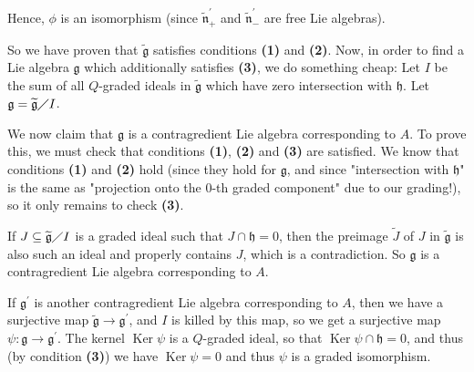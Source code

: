\documentclass
[numbers=enddot,12pt,final,onecolumn,german,notitlepage]{scrartcl}%
\theoremstyle{definition}
\begin{document}
Hence, $\phi$ is an isomorphism (since $\widetilde{\mathfrak{n}}_{+}^{\prime}$
and $\widetilde{\mathfrak{n}}_{-}^{\prime}$ are free Lie algebras).

So we have proven that $\widetilde{\mathfrak{g}}$ satisfies conditions
\textbf{(1)} and \textbf{(2)}. Now, in order to find a Lie algebra
$\mathfrak{g}$ which additionally satisfies \textbf{(3)}, we do something
cheap: Let $I$ be the sum of all $Q$-graded ideals in $\widetilde{\mathfrak{g}%
}$ which have zero intersection with $\mathfrak{h}$. Let $\mathfrak{g}%
=\widetilde{\mathfrak{g}}\diagup I$.

We now claim that $\mathfrak{g}$ is a contragredient Lie algebra corresponding
to $A$. To prove this, we must check that conditions \textbf{(1)},
\textbf{(2)} and \textbf{(3)} are satisfied. We know that conditions
\textbf{(1)} and \textbf{(2)} hold (since they hold for $\mathfrak{g}$, and
since "intersection with $\mathfrak{h}$" is the same as "projection onto the
$0$-th graded component" due to our grading!), so it only remains to check
\textbf{(3)}.

If $J\subseteq\widetilde{\mathfrak{g}}\diagup I$ is a graded ideal such that
$J\cap\mathfrak{h}=0$, then the preimage $\widetilde{J}$ of $J$ in
$\widetilde{\mathfrak{g}}$ is also such an ideal and properly contains $J$,
which is a contradiction. So $\mathfrak{g}$ is a contragredient Lie algebra
corresponding to $A$.

If $\mathfrak{g}^{\prime}$ is another contragredient Lie algebra corresponding
to $A$, then we have a surjective map $\widetilde{\mathfrak{g}}\rightarrow
\mathfrak{g}^{\prime}$, and $I$ is killed by this map, so we get a surjective
map $\psi:\mathfrak{g}\rightarrow\mathfrak{g}^{\prime}$. The kernel
$\operatorname*{Ker}\psi$ is a $Q$-graded ideal, so that $\operatorname*{Ker}%
\psi\cap\mathfrak{h}=0$, and thus (by condition \textbf{(3)}) we have
$\operatorname*{Ker}\psi=0$ and thus $\psi$ is a graded isomorphism.
\end{document}
